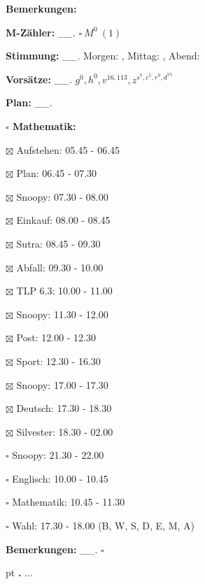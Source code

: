 \documentclass[10pt,a4paper]{article}
\newcounter{notec}
\newcommand\notep[1]{%
  \stepcounter{notec}
  \vskip #1pt
  {\bf\arabic{notec}.}
}
\newcommand\prop[1] {{\color {alizarin} {\bf #1}}}             %
\newcommand\draf[1] {{\color {amber(sae/ece)} {\bf #1}}}       %
\newcommand\mand[1] {{\color {burntorange} {\bf #1}}}          %
\newcommand\topspace{\vskip -15pt \hskip 20pt}
\newcommand\bottomspace{\vskip 4pt}
\newcommand\n[1] { {\sl #1.} \hskip 5pt }
\begin{document}
\begin{mdframed}[style=daystyle]
\begin{labeling}{{\mand {Bemerkungen:}}}
  \item[{\mand {M-Zähler:}}]     \n{\_\_} $\square\ M^0\ (1)$
  \item[{\mand {Stimmung:}}]     \n{\_\_} Morgen: , Mittag: , Abend: 
  \item[{\mand {Vorsätze:}}]     \n{\_\_} $g^{0}, h^{0}, v^{16,113}, z^{s^{7},c^{5},r^{9},d^{75}}$
  \item[{\mand {Plan:}}]         \n{\_\_}
    \topspace
    \begin{minipage}{0.75\textwidth}  
      \begin{labeling}{\prop {$\square$ {Mathematik:}}} 
        \setlength\itemsep{-3pt}
      \item[$\boxtimes$ Aufstehen:]  05.45 - 06.45
      \item[$\boxtimes$ Plan:]       06.45 - 07.30
        
      \item[$\boxtimes$ Snoopy:]     07.30 - 08.00
      \item[$\boxtimes$ Einkauf:]    08.00 - 08.45
      \item[$\boxtimes$ Sutra:]      08.45 - 09.30
      \item[$\boxtimes$ Abfall:]     09.30 - 10.00
      \item[$\boxtimes$ TLP 6.3:]    10.00 - 11.00
        
      \item[$\boxtimes$ Snoopy:]     11.30 - 12.00
      \item[$\boxtimes$ Post:]       12.00 - 12.30
      \item[$\boxtimes$ Sport:]      12.30 - 16.30
        
      \item[$\boxtimes$ Snoopy:]     17.00 - 17.30
      \item[$\boxtimes$ Deutsch:]    17.30 - 18.30        
      \item[$\boxtimes$ Silvester:]  18.30 - 02.00
        
      \item[$\square$ Snoopy:]     21.30 - 22.00
        
      \item[$\square$ Englisch:]   10.00 - 10.45
      \item[$\square$ Mathematik:] 10.45 - 11.30
        
      \item[$\square$ Wahl:]       17.30 - 18.00 (B, W, S, D, E, M, A)
        
      \end{labeling}
    \end{minipage}
    \bottomspace
  \item[{\mand {Bemerkungen:}}]  \n{\_\_} {\draf {$\square$}}
  \end{labeling}
    
  \setcounter{notec}{0}
  
  \notep 0 $\ldots$

\end{mdframed}
\end{document}
